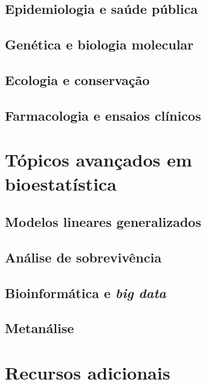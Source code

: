 \documentclass[
]{book}
\begin{document}
\section{Epidemiologia e saúde pública}\label{epidemiologia-e-sauxfade-puxfablica}

\section{Genética e biologia molecular}\label{genuxe9tica-e-biologia-molecular}

\section{Ecologia e conservação}\label{ecologia-e-conservauxe7uxe3o}

\section{Farmacologia e ensaios clínicos}\label{farmacologia-e-ensaios-cluxednicos}

\chapter{Tópicos avançados em bioestatística}\label{tuxf3picos-avanuxe7ados-em-bioestatuxedstica}

\section{Modelos lineares generalizados}\label{modelos-lineares-generalizados}

\section{Análise de sobrevivência}\label{anuxe1lise-de-sobrevivuxeancia}

\section{\texorpdfstring{Bioinformática e \emph{big data}}{Bioinformática e big data}}\label{bioinformuxe1tica-e-big-data}

\section{Metanálise}\label{metanuxe1lise}

\chapter{Recursos adicionais}\label{recursos-adicionais}
\end{document}
